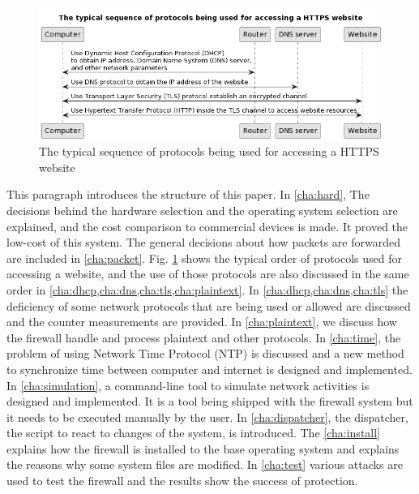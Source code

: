 \documentclass[mscthesis]{usiinfthesis}
\begin{document}
\paragraph{}
\begin{figure}[H]
  \centering
  \includegraphics[width=\textwidth]{graphics/puml/typical-sequence-of-https.png}
  \caption{The typical sequence of protocols being used for accessing a HTTPS website}
  \label{fig:typical-sequence}
\end{figure}
This paragraph introduces the structure of this paper. In \cref{cha:hard}, The decisions behind the hardware selection and the operating system selection are explained, and the cost comparison to commercial devices is made. It proved the low-cost of this system. The general decisions about how packets are forwarded are included in \cref{cha:packet}. Fig. \ref{fig:typical-sequence} shows the typical order of protocols used for accessing a website, and the use of those protocols are also discussed in the same order in \cref{cha:dhcp,cha:dns,cha:tls,cha:plaintext}. In \cref{cha:dhcp,cha:dns,cha:tls} the deficiency of some network protocols that are being used or allowed are discussed and the counter measurements are provided. In \cref{cha:plaintext}, we discuss how the firewall handle and process plaintext and other protocols. In \cref{cha:time}, the problem of using Network Time Protocol (NTP) is discussed and a new method to synchronize time between computer and internet is designed and implemented. In \cref{cha:simulation}, a command-line tool to simulate network activities is designed and implemented. It is a tool being shipped with the firewall system but it needs to be executed manually by the user. In \cref{cha:dispatcher}, the dispatcher, the script to react to changes of the system, is introduced. The \cref{cha:install} explains how the firewall is installed to the base operating system and explains the reasons why some system files are modified. In \cref{cha:test} various attacks are used to test the firewall and the results show the success of protection.
\end{document}
